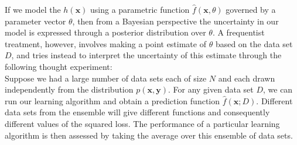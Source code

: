 \documentclass[twoside]{article}
\begin{document}
If we model the $h(\boldsymbol{x})$ using a parametric function $\hat{f}(\boldsymbol{x}, \theta)$ governed by a parameter vector $\theta$, then from a Bayesian perspective the uncertainty in our model is expressed through a posterior distribution over $\theta$. A frequentist treatment, however, involves making a point estimate of $\theta$ based on the data set $D$, and tries instead to interpret the uncertainty of this estimate through the following thought experiment:\\
Suppose we had a large number of data sets each of size $N$ and each drawn independently from the distribution $p(\boldsymbol{x}, \boldsymbol{y})$. For any given data set $D$, we can run our learning algorithm and obtain a prediction function $\hat{f}(\boldsymbol{x}; D)$. Different data sets from the ensemble will give different functions and consequently different values of the squared loss. The performance of a particular learning algorithm is then assessed by taking the average over this ensemble of data sets.\medskip
\end{document}
